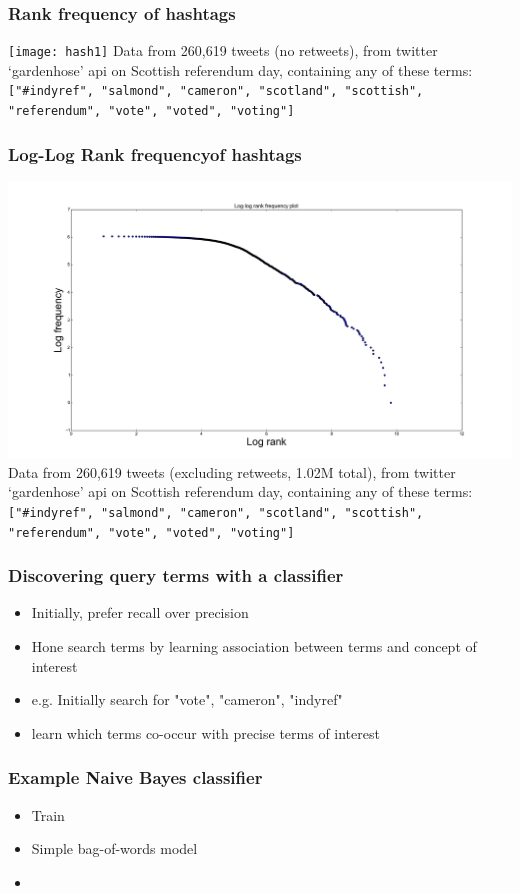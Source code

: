 \documentclass[11pt, table, dvipsnames]{beamer}
\begin{document}
\begin{frame}
  \frametitle{Rank frequency of hashtags}

    \texttt{[image: hash1]}
  \scriptsize
  Data from 260,619 tweets (no retweets), from twitter `gardenhose' api on Scottish referendum day, containing any of these terms: \texttt{["\#indyref", "salmond", "cameron", "scotland", "scottish", "referendum", "vote", "voted", "voting"]}
\end{frame}

\begin{frame}
  \frametitle{Log-Log Rank frequencyof hashtags}

    \includegraphics[scale=0.20]{zipf2}
  \scriptsize
  Data from 260,619 tweets (excluding retweets, 1.02M total), from twitter `gardenhose' api on Scottish referendum day, containing any of these terms: \texttt{["\#indyref", "salmond", "cameron", "scotland", "scottish", "referendum", "vote", "voted", "voting"]}
\end{frame}

\begin{frame}
  \frametitle{Discovering query terms with a classifier}
  \begin{itemize}
  \item Initially, prefer recall over precision
  \item Hone search terms by learning association between terms and concept of interest
  \item e.g. Initially search for "vote", "cameron", "indyref"
  \item learn which terms co-occur with precise terms of interest
  \end{itemize}
\end{frame}

\begin{frame}
  \frametitle{Example Naive Bayes classifier}
  \begin{itemize}
  \item Train 
  \item Simple bag-of-words model
  \item 
  \end{itemize}
\end{frame}
\end{document}

